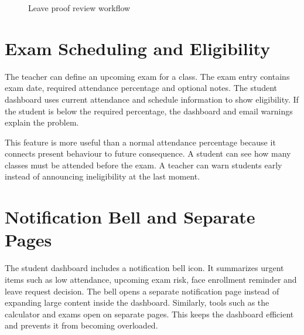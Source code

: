 \begin{figure}[H]
\centering
{}
\caption{Leave proof review workflow}
\label{fig:leave-flow}
\end{figure}

\section{Exam Scheduling and Eligibility}

The teacher can define an upcoming exam for a class. The exam entry contains exam date, required attendance percentage and optional notes. The student dashboard uses current attendance and schedule information to show eligibility. If the student is below the required percentage, the dashboard and email warnings explain the problem.

This feature is more useful than a normal attendance percentage because it connects present behaviour to future consequence. A student can see how many classes must be attended before the exam. A teacher can warn students early instead of announcing ineligibility at the last moment.

\section{Notification Bell and Separate Pages}

The student dashboard includes a notification bell icon. It summarizes urgent items such as low attendance, upcoming exam risk, face enrollment reminder and leave request decision. The bell opens a separate notification page instead of expanding large content inside the dashboard. Similarly, tools such as the calculator and exams open on separate pages. This keeps the dashboard efficient and prevents it from becoming overloaded.

